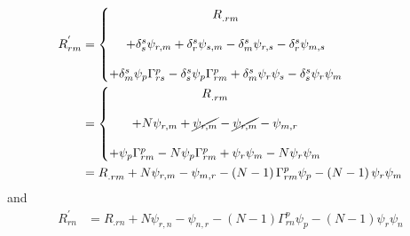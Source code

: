 \begin{align*}
R^{'}_{rm} &= \left\{\begin{matrix}
R^{}_{.rm}\\\\
+\delta^s_s\psi_{r,m} +\delta^s_r\psi_{s,m}-\delta^s_m\psi_{r,s} -\delta^s_r\psi_{m,s}\\\\
+\delta^s_m\psi_p\Gamma^{p}_{rs} 
-\delta^s_s\psi_p \Gamma^{p}_{rm}
+\delta^s_m\psi_r\psi_s  -\delta^s_s\psi_r\psi_m 
\end{matrix}\right.\\
&=\left\{\begin{matrix}
R^{}_{.rm}\\\\
+N\psi_{r,m} +\cancel{\psi_{r,m}}-\cancel{\psi_{r,m}} -\psi_{m,r}\\\\
+\psi_p\Gamma^{p}_{rm} 
-N\psi_p \Gamma^{p}_{rm}
+\psi_r\psi_m  -N\psi_r\psi_m 
\end{matrix}\right.\\
&=R^{}_{.rm}
+N\psi_{r,m} -\psi_{m,r} -\left(N-1\right) \Gamma^{p}_{rm}\psi_p
-\left(N-1\right)\psi_r\psi_m  
\end{align*}
and
\begin{align*}
R^{'}_{rn} &=R^{}_{.rn}
+N\psi_{r,n} -\psi_{n,r} -\left(N-1\right) \Gamma^{p}_{rn}\psi_p
-\left(N-1\right)\psi_r\psi_n  
\end{align*}


